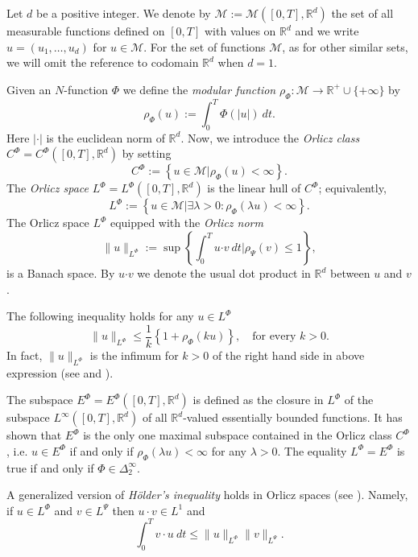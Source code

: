 \documentclass[twoside]{elsarticle}
\theoremstyle{remark}
\newcommand{\orlnor}{\|_{L^{\Phi}}}
\newcommand{\lphi}{L^{\Phi}}
\newcommand{\lpsi}{L^{\Psi}}
\newcommand{\ephi}{E^{\Phi}}
\newcommand{\claseor}{C^{\Phi}}
\renewcommand{\b}[1]{\boldsymbol{#1}}
\newcommand{\rr}{\mathbb{R}}
\renewcommand{\leq}{\leqslant}
\begin{document}
Let $d$ be a positive integer. We denote by $\mathcal{M}:=\mathcal{M}([0,T],\rr^d)$  the set of all measurable functions defined on $[0,T]$ with values on $\mathbb{R}^d$ and  we write $u=(u_1,\dots,u_d)$ for  $u\in \mathcal{M}$. For the set of functions $\mathcal{M}$, as for other similar sets, we will omit the reference to codomain $\mathbb{R}^d$ when $d=1$.


Given  an $N$-function $\Phi$ we define the \emph{modular function}
$\rho_{\Phi}:\mathcal{M}\to \mathbb{R}^+\cup\{+\infty\}$ by
\[\rho_{\Phi}(u):= \int_0^T \Phi(|u|)\ dt.\]
Here $|\cdot|$ is the euclidean norm of $\mathbb{R}^d$.
Now, we introduce the \emph{Orlicz class} $C^{\Phi}=C^{\Phi}([0,T],\rr^d)$   by setting
\begin{equation}\label{claseOrlicz}
  C^{\Phi}:=\left\{u\in \mathcal{M} | \rho_{\Phi}(u)< \infty \right\}.
\end{equation}
The \emph{Orlicz space} $\lphi=L^{\Phi}([0,T],\rr^d)$ is the linear hull of $\claseor$;
equivalently,
\begin{equation}\label{espacioOrlicz}
\lphi:=\left\{ u\in \mathcal{M}| \exists \lambda>0: \rho_{\Phi}(\lambda u) < \infty   \right\}.
\end{equation}
  The Orlicz space $\lphi$ equipped with the \emph{Orlicz norm}
\[
\|  u  \orlnor:=\sup \left\{  \int_0^T u\b{\cdot} v\ dt \big| \rho_{\Psi}(v)\leq 1\right\},
\]
is a Banach space. By $u\b{\cdot} v$ we denote the usual dot product in $\mathbb{R}^{d}$ between $u$ and $v$.

The following  inequality holds for any $u\in\lphi$
\begin{equation}\label{amemiya-ine}
\|u\orlnor\leq \frac{1}{k}\left\{1+\rho_{\Phi}(ku)\right\},\quad\text{for every } k>0.
\end{equation}
In fact, $\|u\orlnor$ is the infimum for $k>0$ of the right hand side in above expression  (see \cite[Thm. 10.5]{KR} and \cite{hudzik2000amemiya}).


The subspace $\ephi=\ephi([0,T],\rr^d)$ is defined as the closure in $\lphi$ of the subspace $L^{\infty}([0,T],\rr^d)$ of all $\mathbb{R}^d$-valued essentially bounded functions. It has shown that  $\ephi$ is the only one maximal subspace contained in the Orlicz class $\claseor$, i.e.
$u\in\ephi$ if and only if $\rho_{\Phi}(\lambda u)<\infty$ for any $\lambda>0$. The equality $\lphi=\ephi$ is true if and only if $\Phi\in\Delta_2^{\infty}$.

A generalized version of \emph{H\"older's inequality} holds in Orlicz spaces (see \cite[Thm. 9.3]{KR}). Namely, if $u\in\lphi$ and $v\in\lpsi$ then $u\cdot v\in L^1$ and
\begin{equation}\label{holder}
\int_0^Tv\cdot u\ dt\leq \|u\orlnor\|v\|_{L^{\Psi}}.
\end{equation}
\end{document}
